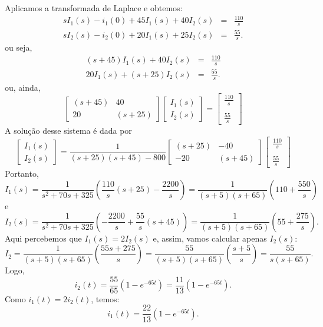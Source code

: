 Aplicamos a transformada de Laplace e obtemos:
\begin{eqnarray*}
sI_1(s)-i_1(0)+45I_1(s)+40I_2(s)&=&\frac{110}{s}\\
sI_2(s)-i_2(0)+20I_1(s)+25I_2(s)&=&\frac{55}{s} .
\end{eqnarray*}
ou seja,
\begin{eqnarray*}
\left(s+45\right) I_1(s)+40I_2(s)&=&\frac{110}{s}\\
20I_1(s)+\left(s+25\right)I_2(s)&=&\frac{55}{s} .
\end{eqnarray*}
ou, ainda,
\begin{equation*}
\left[\begin{array}{cc}  \left(s+45\right) &40\\20& \left(s+25\right) \end{array}\right]\left[\begin{array}{c}I_1(s)\\I_2(s)\end{array}\right]=\left[\begin{array}{c}\frac{110}{s}\\ \\
\frac{55}{s}\end{array}\right]
\end{equation*}
A solução desse sistema é dada por
\begin{equation*}
\left[\begin{array}{c}I_1(s)\\I_2(s)\end{array}\right]=\frac{1}{(s+25)(s+45)-800}\left[\begin{array}{cc}  \left(s+25\right) &-40\\-20& \left(s+45\right) \end{array}\right]\left[\begin{array}{c}\frac{110}{s}\\ \\
\frac{55}{s}\end{array}\right]
\end{equation*}
Portanto,
$$
I_1(s)=\frac{1}{s^2+70s+325}\left(\frac{110}{s}(s+25)-\frac{2200}{s}\right)=\frac{1}{(s+5)(s+65)}\left(110+\frac{550}{s}\right)
$$
e
$$
I_2(s)=\frac{1}{s^2+70s+325}\left(-\frac{2200}{s}+\frac{55}{s}(s+45)\right)=\frac{1}{(s+5)(s+65)}\left(55+\frac{275}{s}\right).
$$
Aqui percebemos que $I_1(s)=2I_2(s)$ e, assim, vamos calcular apenas $I_2(s)$: 
$$
I_2=\frac{1}{(s+5)(s+65)}\left(\frac{55s+275}{s}\right)=\frac{55}{(s+5)(s+65)}\left(\frac{s+5}{s}\right)=\frac{55}{s(s+65)}.
$$
Logo,
$$
i_2(t)=\frac{55}{65}\left(1-e^{-65t}\right)=\frac{11}{13}\left(1-e^{-65t}\right).
$$
Como $i_1(t)=2i_2(t)$, temos:
$$
i_1(t)=\frac{22}{13}\left(1-e^{-65t}\right).
$$
